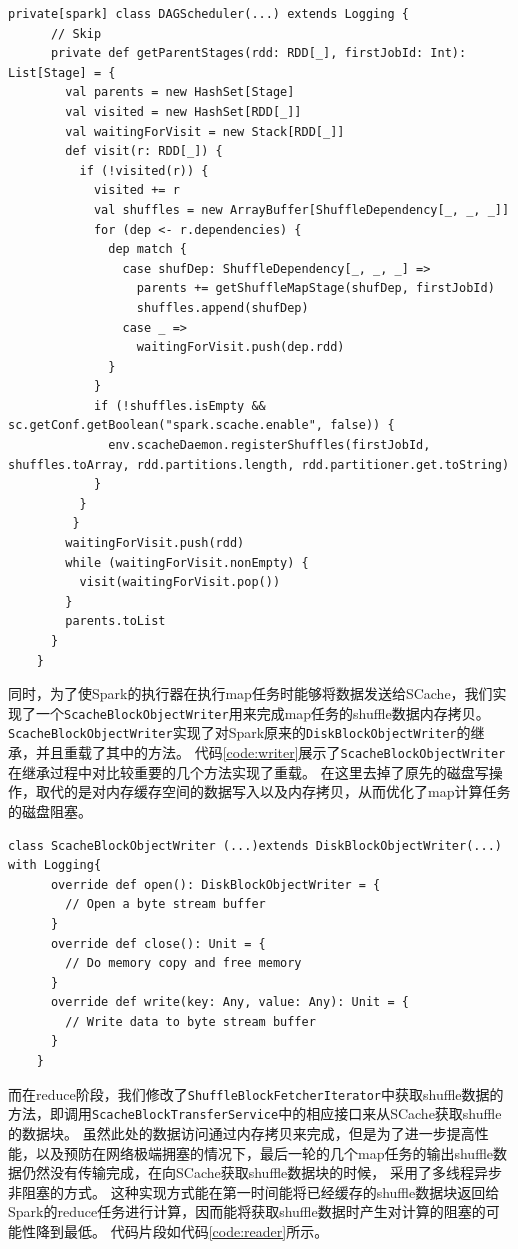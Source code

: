\begin{lstlisting}[style={myScalastyle}, caption={DAGScheduler代码片段}, label={code:dagScheduler}]
    private[spark] class DAGScheduler(...) extends Logging {
      // Skip
      private def getParentStages(rdd: RDD[_], firstJobId: Int): List[Stage] = {
        val parents = new HashSet[Stage]
        val visited = new HashSet[RDD[_]]
        val waitingForVisit = new Stack[RDD[_]]
        def visit(r: RDD[_]) {
          if (!visited(r)) {
            visited += r
            val shuffles = new ArrayBuffer[ShuffleDependency[_, _, _]]
            for (dep <- r.dependencies) {
              dep match {
                case shufDep: ShuffleDependency[_, _, _] =>
                  parents += getShuffleMapStage(shufDep, firstJobId)
                  shuffles.append(shufDep)
                case _ =>
                  waitingForVisit.push(dep.rdd)
              }
            }
            if (!shuffles.isEmpty && sc.getConf.getBoolean("spark.scache.enable", false)) {
              env.scacheDaemon.registerShuffles(firstJobId, shuffles.toArray, rdd.partitions.length, rdd.partitioner.get.toString)
            }
          }
         }
        waitingForVisit.push(rdd)
        while (waitingForVisit.nonEmpty) {
          visit(waitingForVisit.pop())
        }
        parents.toList
      }
    }
\end{lstlisting}

同时，为了使Spark的执行器在执行map任务时能够将数据发送给SCache，我们实现了一个\verb|ScacheBlockObjectWriter|用来完成map任务的shuffle数据内存拷贝。
\verb|ScacheBlockObjectWriter|实现了对Spark原来的\verb|DiskBlockObjectWriter|的继承，并且重载了其中的方法。
代码\ref{code:writer}展示了\verb|ScacheBlockObjectWriter|在继承过程中对比较重要的几个方法实现了重载。
在这里去掉了原先的磁盘写操作，取代的是对内存缓存空间的数据写入以及内存拷贝，从而优化了map计算任务的磁盘阻塞。

\begin{lstlisting}[style={myScalastyle}, caption={ScacheBlockObjectWriter代码片段}, label={code:writer}]
    class ScacheBlockObjectWriter (...)extends DiskBlockObjectWriter(...) with Logging{
      override def open(): DiskBlockObjectWriter = {
        // Open a byte stream buffer
      }
      override def close(): Unit = {
        // Do memory copy and free memory
      }
      override def write(key: Any, value: Any): Unit = {
        // Write data to byte stream buffer
      }
    }
\end{lstlisting}

而在reduce阶段，我们修改了\verb|ShuffleBlockFetcherIterator|中获取shuffle数据的方法，即调用\verb|ScacheBlockTransferService|中的相应接口来从SCache获取shuffle的数据块。
虽然此处的数据访问通过内存拷贝来完成，但是为了进一步提高性能，以及预防在网络极端拥塞的情况下，最后一轮的几个map任务的输出shuffle数据仍然没有传输完成，在向SCache获取shuffle数据块的时候，
采用了多线程异步非阻塞的方式。
这种实现方式能在第一时间能将已经缓存的shuffle数据块返回给Spark的reduce任务进行计算，因而能将获取shuffle数据时产生对计算的阻塞的可能性降到最低。
代码片段如代码\ref{code:reader}所示。

